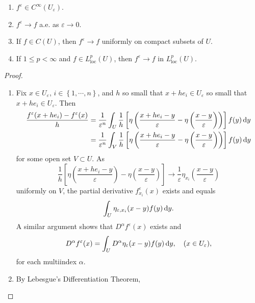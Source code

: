\begin{theorem}
  \label{theorem-properties-of-mollifiers}
  \begin{enumerate}
    \item \( f^{\varepsilon} \in C^{\infty}(U_{\varepsilon}) \).
    \item \( f^{\varepsilon} \to f \) a.e. as \( \varepsilon \to 0 \).
    \item If \( f \in C(U) \), then \( f^{\varepsilon} \to f \) uniformly on compact subsets of \( U \).
    \item If \( 1 \leq p < \infty \) and \( f \in L_{\operatorname{loc}}^{p}(U) \), then \( f^{\varepsilon} \to f \) in \( L_{\operatorname{loc}}^{p}(U) \).
  \end{enumerate}
\end{theorem}
\begin{proof}
\begin{enumerate}
  \item Fix \( x \in U_{\varepsilon} \), \( i \in \left\lbrace 1, \cdots, n \right\rbrace \), and \( h \) so small that \( x + he_i \in U_{\varepsilon} \) so small that \( x + he_i \in U_{\varepsilon} \).
  Then
  \begin{align*}
    \frac{f^{\varepsilon}(x + h e_i) - f^{\varepsilon}(x)}{h} &= \frac{1}{\varepsilon^n} \int_U \frac{1}{h} \left[ \eta \left( \frac{x + he_i - y}{\varepsilon} - \eta \left( \frac{x - y}{\varepsilon} \right) \right) \right] f(y) \mathop{}\!\mathrm{d} y\\
                                                              &=\frac{1}{\varepsilon^n} \int_V \frac{1}{h} \left[ \eta \left( \frac{x + he_i - y}{\varepsilon} - \eta \left( \frac{x - y}{\varepsilon} \right) \right) \right] f(y) \mathop{}\!\mathrm{d} y
  \end{align*}
  for some open set \( V \subset U \). As
  \[
    \frac{1}{h} \left[ \eta \left( \frac{x + he_i - y}{\varepsilon} \right) - \eta \left( \frac{x - y}{\varepsilon} \right) \right] \to \frac{1}{\varepsilon} \eta_{x_i} \left(\frac{x - y}{\varepsilon}\right)
  \]
  uniformly on \( V \), the partial derivative \( f^{\varepsilon}_{x_i}(x) \) exists and equals
  \[
    \int_U \eta_{\varepsilon, x_i}(x - y)f(y) \mathop{}\!\mathrm{d} y.
  \]
  A similar argument shows that \( D^{\alpha}f^{\varepsilon}(x) \) exists and
  \[
    D^{\alpha} f^{\varepsilon}(x) = \int_{U} D^{\alpha} \eta_{\varepsilon}(x - y) f(y) \mathop{}\!\mathrm{d} y,\quad (x \in U_{\varepsilon}),
  \]
  for each multiindex \( \alpha \).
  \item By Lebesgue's Differentiation Theorem, %

\end{enumerate}
\end{proof}
